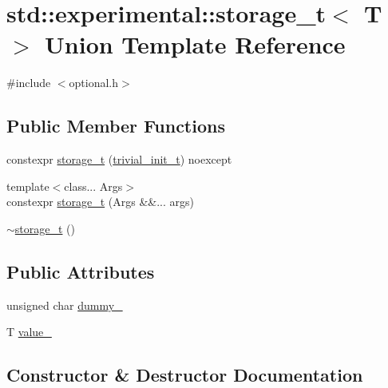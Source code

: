 \hypertarget{unionstd_1_1experimental_1_1storage__t}{}\section{std\+:\+:experimental\+:\+:storage\+\_\+t$<$ T $>$ Union Template Reference}
\label{unionstd_1_1experimental_1_1storage__t}


{\ttfamily \#include $<$optional.\+h$>$}

\subsection*{Public Member Functions}
\begin{DoxyCompactItemize}
\item 
constexpr \mbox{\hyperlink{unionstd_1_1experimental_1_1storage__t_a66bf7a342f8770f3213d17b2a4b3b33c}{storage\+\_\+t}} (\mbox{\hyperlink{structstd_1_1experimental_1_1trivial__init__t}{trivial\+\_\+init\+\_\+t}}) noexcept
\item 
{\footnotesize template$<$class... Args$>$ }\\constexpr \mbox{\hyperlink{unionstd_1_1experimental_1_1storage__t_ae93191c4a215b166fe38fbafabd26449}{storage\+\_\+t}} (Args \&\&... args)
\item 
\mbox{\hyperlink{unionstd_1_1experimental_1_1storage__t_a9de04c8f12a996c2b9b55d430713b31e}{$\sim$storage\+\_\+t}} ()
\end{DoxyCompactItemize}
\subsection*{Public Attributes}
\begin{DoxyCompactItemize}
\item 
unsigned char \mbox{\hyperlink{unionstd_1_1experimental_1_1storage__t_a66c46e8a91805a1495127fa280a3f58a}{dummy\+\_\+}}
\item 
T \mbox{\hyperlink{unionstd_1_1experimental_1_1storage__t_afc411a630487df07bf6278ebbef1ebb7}{value\+\_\+}}
\end{DoxyCompactItemize}


\subsection{Constructor \& Destructor Documentation}
\mbox{\label{unionstd_1_1experimental_1_1storage__t_a66bf7a342f8770f3213d17b2a4b3b33c}} 
